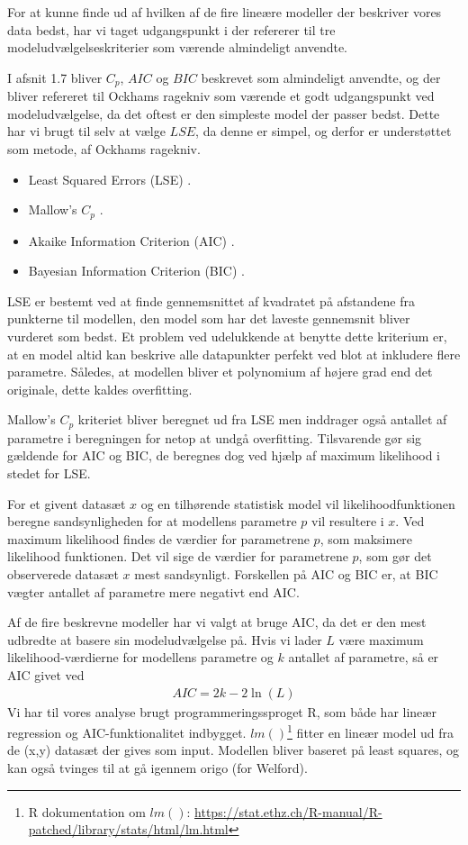 For at kunne finde ud af hvilken af de fire lineære modeller der beskriver vores data bedst, har vi taget udgangspunkt i \cite{wu2011experiments} der refererer til tre modeludvælgelseskriterier som værende almindeligt anvendte.

I \cite{wu2011experiments} afsnit 1.7 bliver $C_p$, $AIC$ og $BIC$ beskrevet som almindeligt anvendte, og der bliver refereret til Ockhams ragekniv som værende et godt udgangspunkt ved modeludvælgelse, da det oftest er den simpleste model der passer bedst. Dette har vi brugt til selv at vælge $LSE$, da denne er simpel, og derfor er understøttet som metode, af Ockhams ragekniv.
\begin{itemize}
\item{Least Squared Errors (LSE) \cite{legendre1805}.}
\item{Mallow's $C_p$ \cite{mallow1973}.}
\item{Akaike Information Criterion (AIC) \cite{akaike1973}.}
\item{Bayesian Information Criterion (BIC) \cite{schwarz1978}.}
\end{itemize}
LSE er bestemt ved at finde gennemsnittet af kvadratet på afstandene fra punkterne til modellen, den model som har det laveste gennemsnit bliver vurderet som bedst. Et problem ved udelukkende at benytte dette kriterium er, at en model altid kan beskrive alle datapunkter perfekt ved blot at inkludere flere parametre. Således, at modellen bliver et polynomium af højere grad end det originale, dette kaldes overfitting.

Mallow's $C_p$ kriteriet bliver beregnet ud fra LSE men inddrager også antallet af parametre i beregningen for netop at undgå overfitting. Tilsvarende gør sig gældende for AIC og BIC, de beregnes dog ved hjælp af maximum likelihood i stedet for LSE.

For et givent datasæt $x$ og en tilhørende statistisk model vil likelihoodfunktionen beregne sandsynligheden for at modellens parametre $p$ vil resultere i $x$. Ved maximum likelihood findes de værdier for parametrene $p$, som maksimere likelihood funktionen. Det vil sige de værdier for parametrene $p$, som gør det observerede datasæt $x$ mest sandsynligt. Forskellen på AIC og BIC er, at BIC vægter antallet af parametre mere negativt end AIC.

Af de fire beskrevne modeller har vi valgt at bruge AIC, da det er den mest udbredte at basere sin modeludvælgelse på. Hvis vi lader $L$ være maximum likelihood-værdierne for modellens parametre og $k$ antallet af parametre, så er AIC givet ved
\begin{align}
AIC = 2k - 2\ln(L) \label{eq:aic}
\end{align}
Vi har til vores analyse brugt programmeringssproget R, som både har lineær regression og AIC-funktionalitet indbygget. $lm()$\footnote{R dokumentation om $lm()$: \url{https://stat.ethz.ch/R-manual/R-patched/library/stats/html/lm.html}} fitter en lineær model ud fra de (x,y) datasæt der gives som input. Modellen bliver baseret på least squares, og kan også tvinges til at gå igennem origo (for Welford).

